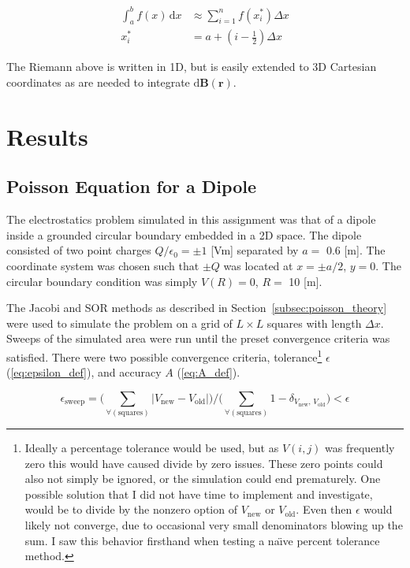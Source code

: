 \documentclass[notitlepage,aps,prd,nofootinbib]{revtex4-1}
\begin{document}
\begin{align} 
\int_{a}^{b} f\left(x\right)\,\mathrm{d}x &\approx \displaystyle\sum_{i=1}^{n} f\left(x_{i}^{*}\right) \Delta x \label{eq:riemann} \\
x_{i}^{*} &= a + \left(i-\frac{1}{2}\right) \Delta x \label{eq:reimann_midpoint}
\end{align}

The Riemann above is written in 1D, but is easily extended to 3D Cartesian coordinates as are needed to integrate $\mathrm{d}\mathbf{B}\left(\mathbf{r}\right)$. 


\clearpage
\section{Results}
\label{sec:results}

\subsection{Poisson Equation for a Dipole}
\label{subsec:poisson_results}
The electrostatics problem simulated in this assignment was that of a dipole inside a grounded circular boundary embedded in a 2D space. The dipole consisted of two point charges $Q/\epsilon_{0} = \pm1$ [Vm] separated by $a =$ 0.6 [m]. The coordinate system was chosen such that $\pm Q$ was located at $x = \pm a/2$, $y=0$. The circular boundary condition was simply $V\left(R\right) = 0$, $R =$ 10 [m].

The Jacobi and SOR methods as described in Section~\ref{subsec:poisson_theory} were used to simulate the problem on a grid of $L \times L$ squares with length $\Delta x$. Sweeps of the simulated area were run until the preset convergence criteria was satisfied. There were two possible convergence criteria, tolerance\footnote{Ideally a percentage tolerance would be used, but as $V\left(i,j\right)$ was frequently zero this would have caused divide by zero issues. These zero points could also not simply be ignored, or the simulation could end prematurely. One possible solution that I did not have time to implement and investigate, would be to divide by the nonzero option of $V_{\mathrm{new}}$ or $V_{\mathrm{old}}$. Even then $\epsilon$ would likely not converge, due to occasional very small denominators blowing up the sum. I saw this behavior firsthand when testing a na\"{\i}ve percent tolerance method.} $\epsilon$ (\ref{eq:epsilon_def}), and accuracy $A$ (\ref{eq:A_def}).

\begin{equation} \label{eq:epsilon_def} 
\epsilon_{\mathrm{sweep}} = \Bigg( \displaystyle\sum_{\forall (\mathrm{squares})} \left|V_{\mathrm{new}} - V_{\mathrm{old}}\right|\Bigg) / \Bigg( \displaystyle\sum_{\forall (\mathrm{squares})} 1 - \delta_{V_{\mathrm{new}},\,V_{\mathrm{old}}} \Bigg) < \epsilon
\end{equation}
\end{document}
